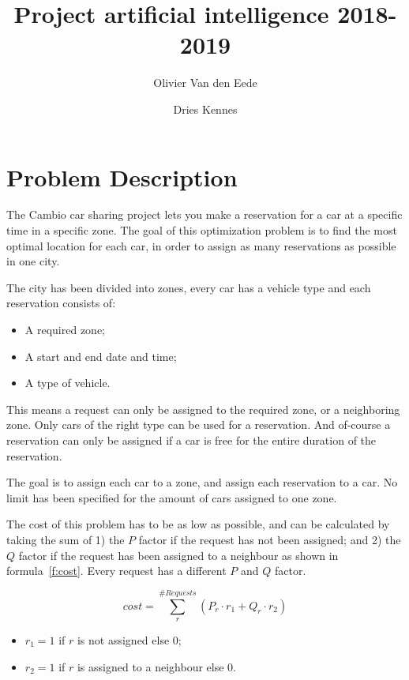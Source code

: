 \documentclass[11pt,a4paper]{article}
\begin{document}
\title{Project artificial intelligence 2018-2019}
\author[1]{Olivier Van den Eede}
\author[1]{Dries Kennes}
\date{}
\maketitle

\section{Problem Description}
    The Cambio car sharing project lets you make a reservation for a car at a specific time in a specific zone.
    The goal of this optimization problem is to find the most optimal location for each car, in order to assign as many reservations as possible
    in one city.
    
    The city has been divided into zones, every car has a vehicle type and each reservation consists of:
    \begin{itemize} \itemsep-0.5em
        \item A required zone;
        \item A start and end date and time;
        \item A type of vehicle.
    \end{itemize} 

    This means a request can only be assigned to the required zone, or a neighboring zone.
    Only cars of the right type can be used for a reservation.
    And of-course a reservation can only be assigned if a car is free for the entire duration of the reservation.

    The goal is to assign each car to a zone, and assign each reservation to a car.
    No limit has been specified for the amount of cars assigned to one zone.

    The cost of this problem has to be as low as possible, and can be calculated by taking the sum of
    1) the $P$ factor if the request has not been assigned;
    and 2) the $Q$ factor if the request has been assigned to a neighbour
    as shown in formula~\ref{f:cost}.
    Every request has a different $P$ and $Q$ factor.

    \begin{equation}\label{f:cost}
        cost = \sum_{r}^{\#Requests} \left( P_r \cdot r_1 + Q_r \cdot r_2 \right)
    \end{equation}

    \begin{itemize} \itemsep-0.5em
        \item $r_1 = 1$ if $r$ is not assigned else $0$;
        \item $r_2 = 1$ if $r$ is assigned to a neighbour else $0$.
    \end{itemize}
\end{document}
